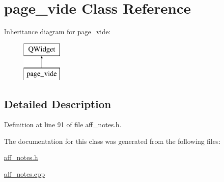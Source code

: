 \hypertarget{classpage__vide}{}\section{page\+\_\+vide Class Reference}
\label{classpage__vide}
Inheritance diagram for page\+\_\+vide\+:\begin{figure}[H]
\begin{center}
\leavevmode
\includegraphics[height=2.000000cm]{classpage__vide}
\end{center}
\end{figure}


\subsection{Detailed Description}


Definition at line 91 of file aff\+\_\+notes.\+h.



The documentation for this class was generated from the following files\+:\begin{DoxyCompactItemize}
\item 
\hyperlink{aff__notes_8h}{aff\+\_\+notes.\+h}\item 
\hyperlink{aff__notes_8cpp}{aff\+\_\+notes.\+cpp}\end{DoxyCompactItemize}
